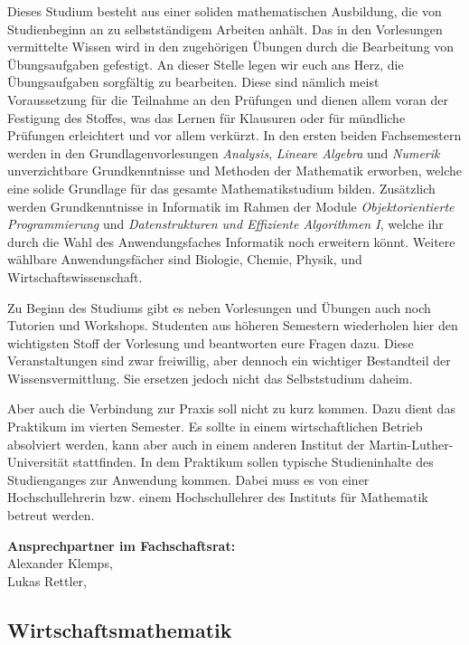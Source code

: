 Dieses Studium besteht aus einer soliden mathematischen Ausbildung, die von Studienbeginn an zu selbstständigem Arbeiten anhält. Das in den Vorlesungen vermittelte Wissen wird in den zugehörigen Übungen durch die Bearbeitung von Übungsauf\-gaben gefestigt.
An dieser Stelle legen wir euch ans Herz, die Übungsaufgaben sorgfältig zu bearbeiten. Diese sind nämlich meist Voraussetzung für die Teilnahme an den Prüfungen und dienen allem voran der Festigung des Stoffes, was das Lernen für Klausuren oder für mündliche Prüfungen erleichtert und vor allem verkürzt. 
In den ersten beiden Fachsemestern werden in den Grundlagenvorlesungen \textit{Analysis}, \textit{Lineare Algebra} und \textit{Numerik} unverzichtbare Grundkenntnisse und Methoden der Mathematik erworben, welche eine solide Grundlage für das gesamte Mathematikstudium bilden. Zusätzlich werden Grundkenntnisse in Informatik im Rahmen der Module \textit{Objektorientierte Programmierung} und \textit{Datenstrukturen und Effiziente Algorithmen I}, welche ihr durch die Wahl des Anwendungsfaches Informatik noch erweitern könnt. Weitere wählbare
Anwendungsfächer sind Biologie, Chemie, Physik, und Wirtschaftswissenschaft.

Zu Beginn des Studiums gibt es neben Vorlesungen und Übungen auch noch Tutorien und Workshops.
Studenten aus höheren Semestern wiederholen hier den wichtigsten Stoff der Vorlesung und beantworten eure Fragen dazu. Diese Veranstaltungen sind zwar freiwillig, aber dennoch ein wichtiger Bestandteil der Wissensvermittlung. Sie ersetzen jedoch nicht das Selbststudium daheim. 

Aber auch die Verbindung zur Praxis soll nicht zu kurz kommen. Dazu dient das Praktikum im vierten Semester.
Es sollte in einem wirtschaftlichen Betrieb absolviert werden, kann aber auch in einem anderen Institut der Martin-Luther-Universität stattfinden.
In dem Praktikum sollen typische Studieninhalte des Studienganges zur Anwendung kommen.
Dabei muss es von einer Hochschullehrerin bzw. einem Hochschullehrer des Instituts für Mathematik betreut werden.

\textbf{Ansprechpartner im Fachschaftsrat:}\\
Alexander Klemps, \\
Lukas Rettler, \\

\newpage

\subsection{Wirtschaftsmathematik}
\label{studiengang_wima}

